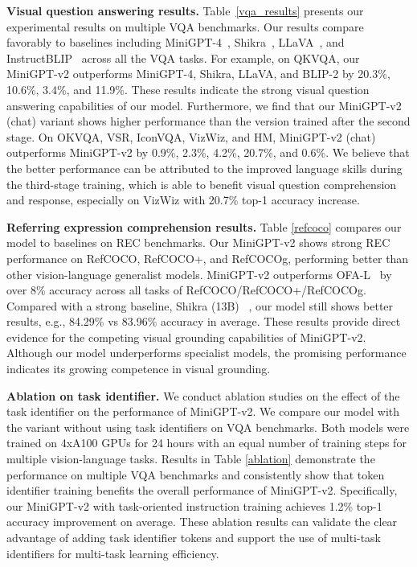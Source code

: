 \noindent \textbf{Visual question answering results.} Table~\ref{vqa_results} presents our experimental results on multiple VQA benchmarks. Our results compare favorably to baselines including MiniGPT-4~\citep{zhu2023minigpt}, Shikra~\citep{shikra}, LLaVA~\citep{llava}, and InstructBLIP~\citep{instructblip} across all the VQA tasks. For example, on QKVQA, our MiniGPT-v2 outperforms MiniGPT-4, Shikra, LLaVA, and BLIP-2 by 20.3\%, 10.6\%, 3.4\%, and 11.9\%. These results indicate the strong visual question answering capabilities of our model. Furthermore, we find that our MiniGPT-v2 (chat) variant shows higher performance than the version trained after the second stage. On OKVQA,  VSR, IconVQA, VizWiz, and HM, MiniGPT-v2 (chat) outperforms MiniGPT-v2 by 0.9\%,  2.3\%, 4.2\%, 20.7\%, and 0.6\%. We believe that the better performance can be attributed to the improved language skills during the third-stage training, which is able to benefit visual question comprehension and response, especially on VizWiz with 20.7\% top-1 accuracy increase.


\noindent \textbf{Referring expression comprehension results.} Table \ref{refcoco} compares our model to baselines on REC benchmarks. Our MiniGPT-v2 shows strong REC performance on RefCOCO, RefCOCO+, and RefCOCOg, performing better than  other vision-language generalist models. MiniGPT-v2 outperforms OFA-L~\citep{ofa} by over 8\% accuracy across all tasks of RefCOCO/RefCOCO+/RefCOCOg. Compared with a strong baseline, Shikra (13B) ~\citep{shikra}, our model still shows better results, e.g., 84.29\% vs 83.96\% accuracy in average. These results provide direct evidence for  the competing visual grounding capabilities of MiniGPT-v2. Although our model underperforms specialist models, the promising performance indicates its growing competence in visual grounding.



\textbf{Ablation on task identifier.} We conduct ablation studies on the effect of the task identifier on the performance of MiniGPT-v2. We compare our model with the variant without using task identifiers on VQA benchmarks. Both models were trained on 4xA100 GPUs for 24 hours with an equal number of training steps for multiple vision-language tasks. Results in Table \ref{ablation} demonstrate the performance on multiple VQA benchmarks and consistently show that token identifier training benefits the overall performance of MiniGPT-v2. Specifically, our MiniGPT-v2 with task-oriented instruction training achieves 1.2\% top-1  accuracy improvement on average. 
These ablation results can validate the clear advantage of adding task identifier tokens and support the use of multi-task identifiers for multi-task learning efficiency.


